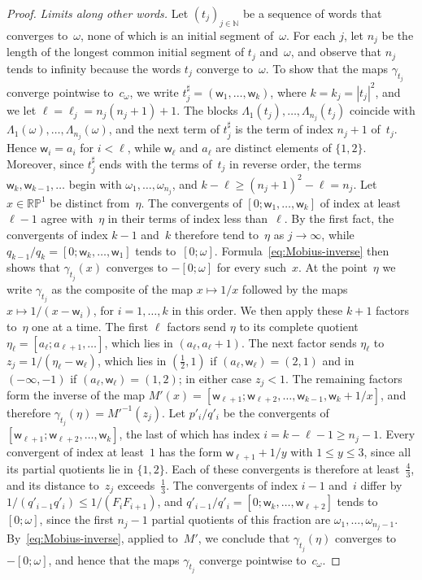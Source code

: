 \documentclass[psamsfonts]{amsart}
\theoremstyle{definition}
\theoremstyle{remark}
\newcommand{\RP}{\mathbb{R}\mathbb{P}}
\numberwithin{equation}{section}
\begin{document}
\begin{proof}
\emph{Limits along other words.}
Let $(t_j)_{j\in\mathbb{N}}$ be a sequence of words that converges to~$\omega$, none of which is an initial segment of~$\omega$.
For each $j$, let $n_j$ be the length of the longest common initial segment of $t_j$ and~$\omega$, and observe that $n_j$ tends to infinity because the words $t_j$ converge to~$\omega$.
To show that the maps $\gamma_{t_j}$ converge pointwise to~$c_\omega$, we write $t_j^\sharp=(\mathsf{w}_1,\dots,\mathsf{w}_k)$, where $k=k_j=|t_j|^2$, and we let $\ell=\ell_j=n_j(n_j+1)+1$.
The blocks $\Lambda_1(t_j),\dots,\Lambda_{n_j}(t_j)$ coincide with $\Lambda_1(\omega),\dots,\Lambda_{n_j}(\omega)$, and the next term of $t_j^\sharp$ is the term of index $n_j+1$ of~$t_j$.
Hence $\mathsf{w}_i=a_i$ for $i<\ell$, while $\mathsf{w}_\ell$ and $a_\ell$ are distinct elements of $\{1,2\}$.
Moreover, since $t_j^\sharp$ ends with the terms of~$t_j$ in reverse order, the terms $\mathsf{w}_k,\mathsf{w}_{k-1},\dots$ begin with $\omega_1,\dots,\omega_{n_j}$, and $k-\ell\ge(n_j+1)^2-\ell=n_j$.
Let $x\in\RP^1$ be distinct from~$\eta$.
The convergents of $[0;\mathsf{w}_1,\dots,\mathsf{w}_k]$ of index at least $\ell-1$ agree with~$\eta$ in their terms of index less than~$\ell$.
By the first fact, the convergents of index $k-1$ and~$k$ therefore tend to~$\eta$ as $j\to\infty$, while $q_{k-1}/q_k=[0;\mathsf{w}_k,\dots,\mathsf{w}_1]$ tends to~$[0;\omega]$.
Formula~\eqref{eq:Mobius-inverse} then shows that $\gamma_{t_j}(x)$ converges to $-[0;\omega]$ for every such~$x$.
At the point~$\eta$ we write $\gamma_{t_j}$ as the composite of the map $x\mapsto1/x$ followed by the maps $x\mapsto1/(x-\mathsf{w}_i)$, for $i=1,\dots,k$ in this order.
We then apply these $k+1$ factors to~$\eta$ one at a time.
The first $\ell$ factors send $\eta$ to its complete quotient $\eta_\ell=[a_\ell;a_{\ell+1},\dots]$, which lies in $(a_\ell,a_\ell+1)$.
The next factor sends $\eta_\ell$ to $z_j=1/(\eta_\ell-\mathsf{w}_\ell)$, which lies in $(\frac12,1)$ if $(a_\ell,\mathsf{w}_\ell)=(2,1)$ and in $(-\infty,-1)$ if $(a_\ell,\mathsf{w}_\ell)=(1,2)$;
in either case $z_j<1$.
The remaining factors form the inverse of the map $M'(x)=[\mathsf{w}_{\ell+1};\mathsf{w}_{\ell+2},\dots,\mathsf{w}_{k-1},\mathsf{w}_k+1/x]$, and therefore $\gamma_{t_j}(\eta)=M'^{-1}(z_j)$.
Let $p'_i/q'_i$ be the convergents of $[\mathsf{w}_{\ell+1};\mathsf{w}_{\ell+2},\dots,\mathsf{w}_k]$, the last of which has index $i=k-\ell-1\ge n_j-1$.
Every convergent of index at least~$1$ has the form $\mathsf{w}_{\ell+1}+1/y$ with $1\le y\le3$, since all its partial quotients lie in $\{1,2\}$.
Each of these convergents is therefore at least~$\frac43$, and its distance to~$z_j$ exceeds~$\frac13$.
The convergents of index $i-1$ and~$i$ differ by $1/(q'_{i-1}q'_i)\le1/(F_iF_{i+1})$, and $q'_{i-1}/q'_i=[0;\mathsf{w}_k,\dots,\mathsf{w}_{\ell+2}]$ tends to~$[0;\omega]$, since the first $n_j-1$ partial quotients of this fraction are $\omega_1,\dots,\omega_{n_j-1}$.
By~\eqref{eq:Mobius-inverse}, applied to~$M'$, we conclude that $\gamma_{t_j}(\eta)$ converges to $-[0;\omega]$, and hence that the maps $\gamma_{t_j}$ converge pointwise to~$c_\omega$.


\end{proof}
\end{document}
